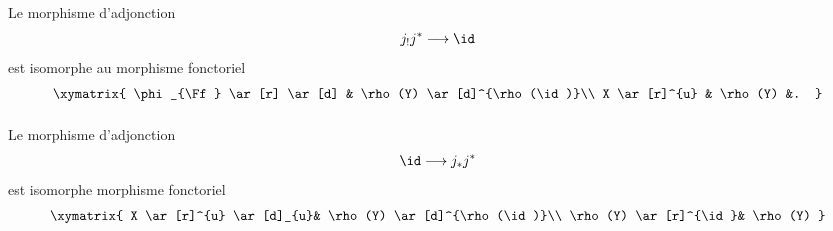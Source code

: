 \documentclass[10pt]{../fichiers-configuration-latex/smfart}
\begin{document}
\paragraph{}
Le morphisme d'adjonction
$$
j_{!}j^{\ast}\longrightarrow \id
$$
est isomorphe au morphisme fonctoriel
\[
\xymatrix{
\phi_{\Ff} \ar[r] \ar[d] & \rho(Y) \ar[d]^{\rho(\id)}\\
X \ar[r]^{u}                 & \rho(Y)     &. }
\]

\paragraph{}
Le morphisme d'adjonction
$$
\id\longrightarrow j_\ast j^{\ast}
$$
est isomorphe  morphisme fonctoriel
\[
\xymatrix{
X  \ar[r]^{u} \ar[d]_{u}& \rho(Y) \ar[d]^{\rho(\id)}\\
\rho(Y) \ar[r]^{\id}& \rho(Y) }
\]
\end{document}
